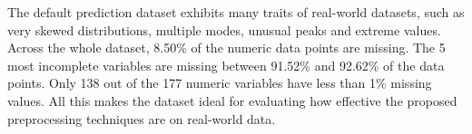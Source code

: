 \documentclass[portrait,final,x11names,a1paper,fontscale=0.4]{baposter}
\begin{document}
\begin{poster}
{    \noindent
    The default prediction dataset exhibits many traits
    of real-world datasets, such as very skewed distributions, multiple modes, unusual peaks
    and extreme values.
    Across the whole dataset, 8.50\% of the numeric data points are missing.
    The 5 most incomplete variables are missing between 91.52\% and 92.62\% of the data points.
    Only 138 out of the 177 numeric variables have less than 1\% missing values. 
    All this makes the dataset ideal for evaluating how effective the proposed
    preprocessing techniques are on real-world data.
}


\end{poster}
\end{document}
